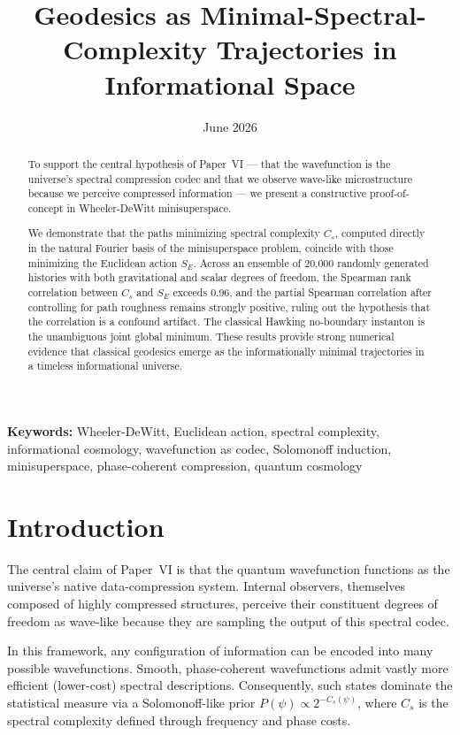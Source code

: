 \documentclass[11pt]{article}
\title{Geodesics as Minimal-Spectral-Complexity Trajectories in Informational Space}
\date{June 2026}
\begin{document}
\maketitle

\begin{abstract}
  To support the central hypothesis of Paper~VI \cite{meskanen2026vi} —
  that the wavefunction is the universe's spectral compression codec and that we observe wave-like
  microstructure because we perceive compressed information —
  we present a constructive proof-of-concept in Wheeler-DeWitt \cite{dewitt1967} minisuperspace.

  We demonstrate that the paths minimizing spectral complexity \(C_s\), computed directly in
  the natural Fourier basis of the minisuperspace problem, coincide with those minimizing the
  Euclidean action \(S_E\). Across an ensemble of 20{,}000 randomly generated histories with
  both gravitational and scalar degrees of freedom, the Spearman rank correlation between
  \(C_s\) and \(S_E\) exceeds 0.96, and the partial Spearman correlation after controlling
  for path roughness remains strongly positive, ruling out the hypothesis that the correlation
  is a confound artifact. The classical Hawking no-boundary instanton is the unambiguous
  joint global minimum.
  These results provide strong numerical evidence that classical geodesics emerge as
  the informationally minimal trajectories in a timeless informational universe.
\end{abstract}

\textbf{Keywords:} Wheeler-DeWitt, Euclidean action, spectral complexity, informational cosmology, wavefunction as codec, Solomonoff induction, minisuperspace, phase-coherent compression, quantum cosmology

\section{Introduction}

The central claim of Paper~VI is that the quantum wavefunction functions as the
universe's native data-compression system.
Internal observers, themselves composed of highly compressed structures, perceive their constituent
degrees of freedom as wave-like because they are sampling the output of this spectral codec.

In this framework, any configuration of information can be encoded into many possible wavefunctions.
Smooth, phase-coherent wavefunctions admit vastly more efficient (lower-cost) spectral descriptions.
Consequently, such states dominate the statistical measure via a Solomonoff-like \cite{solomonoff1964}
prior \(P(\psi) \propto 2^{-C_s(\psi)}\), where \(C_s\) is the spectral complexity defined through frequency and phase costs.
\end{document}
